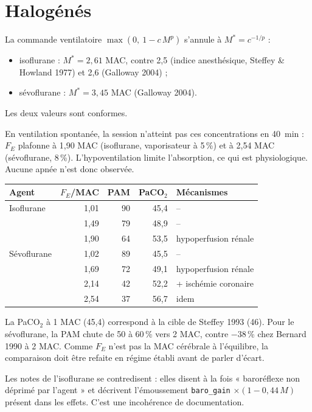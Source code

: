 \documentclass[10pt,a4paper]{article}
\newcommand{\cmd}[1]{\texttt{#1}}
\begin{document}
\section{Halogénés}

La commande ventilatoire $\max(0,\ 1 - c\,M^p)$ s'annule à $M^\ast = c^{-1/p}$ :
\begin{itemize}
\item isoflurane : $M^\ast = 2{,}61$ MAC, contre 2,5 (indice anesthésique, Steffey \& Howland 1977) et 2,6 (Galloway 2004) ;
\item sévoflurane : $M^\ast = 3{,}45$ MAC (Galloway 2004).
\end{itemize}
Les deux valeurs sont conformes.

En ventilation spontanée, la session n'atteint pas ces concentrations en \SI{40}{min} : $F_E$ plafonne à 1,90 MAC (isoflurane, vaporisateur à 5\,\%) et à 2,54 MAC (sévoflurane, 8\,\%). L'hypoventilation limite l'absorption, ce qui est physiologique. Aucune apnée n'est donc observée.

\begin{center}
\begin{tabular}{lrrrl}
\toprule
Agent & $F_E$/MAC & PAM & PaCO$_2$ & Mécanismes\\
\midrule
Isoflurane & 1,01 & 90 & 45,4 & --\\
 & 1,49 & 79 & 48,9 & --\\
 & 1,90 & 64 & 53,5 & hypoperfusion rénale\\
Sévoflurane & 1,02 & 89 & 45,5 & --\\
 & 1,69 & 72 & 49,1 & hypoperfusion rénale\\
 & 2,14 & 42 & 52,2 & + ischémie coronaire\\
 & 2,54 & 37 & 56,7 & idem\\
\bottomrule
\end{tabular}
\end{center}

La PaCO$_2$ à 1 MAC (45,4) correspond à la cible de Steffey 1993 (46). Pour le sévoflurane, la PAM chute de 50 à 60\,\% vers 2 MAC, contre $-38$\,\% chez Bernard 1990 à 2 MAC. Comme $F_E$ n'est pas la MAC cérébrale à l'équilibre, la comparaison doit être refaite en régime établi avant de parler d'écart.

Les notes de l'isoflurane se contredisent : elles disent à la fois « baroréflexe non déprimé par l'agent » et décrivent l'émoussement \cmd{baro\_gain} $\times (1 - 0{,}44\,M)$ présent dans les effets. C'est une incohérence de documentation.
\end{document}
